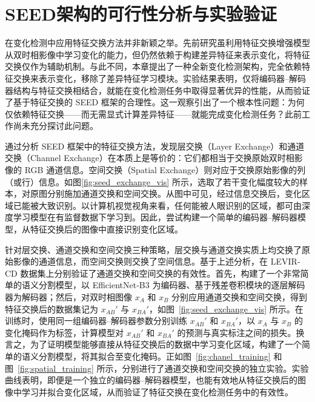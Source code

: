 \section{SEED架构的可行性分析与实验验证}
在变化检测中应用特征交换方法并非新颖之举。先前研究虽利用特征交换增强模型从双时相影像中学习变化的能力，但仍然依赖于构建差异特征来表示变化，将特征交换仅作为辅助机制。与此不同，本章提出了一种全新变化检测架构，完全依赖特征交换来表示变化，移除了差异特征学习模块。实验结果表明，仅将编码器–解码器结构与特征交换相结合，就能在变化检测任务中取得显著优异的性能，从而验证了基于特征交换的 SEED 框架的合理性。这一观察引出了一个根本性问题：为何仅依赖特征交换——而无需显式计算差异特征——就能完成变化检测任务？此前工作尚未充分探讨此问题。

通过分析 SEED 框架中的特征交换方法，发现层交换（Layer Exchange）和通道交换（Channel Exchange）在本质上是等价的：它们都相当于交换原始双时相影像的 RGB 通道信息。空间交换（Spatial Exchange）则对应于交换原始影像的列（或行）信息。如图\ref{fig:seed_exchange_vis} 所示，选取了若干变化幅度较大的样本，对原图分别施加通道交换和空间交换。从图中可见，经过信息交换后，变化区域已能被大致识别。以计算机视觉视角来看，任何能被人眼识别的区域，都可由深度学习模型在有监督数据下学习到。因此，尝试构建一个简单的编码器–解码器模型，从特征交换后的图像中直接识别变化区域。

针对层交换、通道交换和空间交换三种策略，层交换与通道交换实质上均交换了原始影像的通道信息，而空间交换则交换了空间信息。基于上述分析，在 LEVIR‐CD 数据集上分别验证了通道交换和空间交换的有效性。首先，构建了一个非常简单的语义分割模型，以 EfficientNet‐B3 为编码器、基于残差卷积模块的逐层解码器为解码器；然后，对双时相图像 \(x_A\) 和 \(x_B\) 分别应用通道交换和空间交换，得到特征交换后的数据集记为 \(x_{AB}'\) 与 \(x_{BA}'\)，如图~\ref{fig:seed_exchange_vis} 所示。在训练时，使用同一组编码器–解码器参数分别训练 \(x_{AB}'\) 和 \(x_{BA}'\)，以 \(x_A\) 与 \(x_B\) 的变化掩码作为标签，计算模型对 \(x_{AB}'\) 和 \(x_{BA}'\) 的预测与真实标注之间的损失。换言之，为了证明模型能够直接从特征交换后的数据中学习变化区域，构建了一个简单的语义分割模型，将其拟合至变化掩码。正如图~\ref{fig:chanel_training} 和图~\ref{fig:spatial_training} 所示，分别进行了通道交换和空间交换的独立实验。实验曲线表明，即便是一个独立的编码器–解码器模型，也能有效地从特征交换后的图像中学习并拟合变化区域，从而验证了特征交换在变化检测任务中的有效性。  



